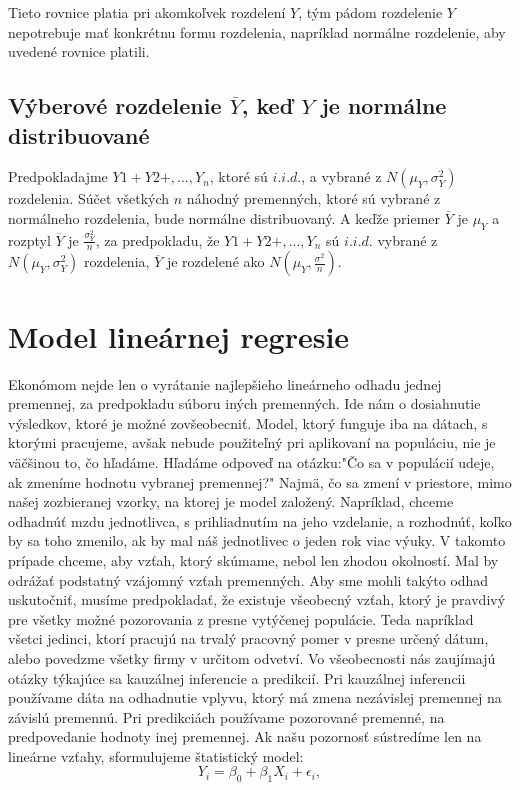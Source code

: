 \documentclass[]{tukediphc}
\begin{document}
Tieto rovnice platia pri akomkoľvek rozdelení $Y$, tým pádom rozdelenie $Y$ nepotrebuje mať konkrétnu formu rozdelenia, napríklad normálne rozdelenie, aby uvedené rovnice platili.  

\subsection{Výberové rozdelenie $\overline{Y}$, keď $Y$ je normálne distribuované}

Predpokladajme $Y1 + Y2 +, ..., Y_n$, ktoré sú $i.i.d.$, a vybrané z $N(\mu_{Y}, \sigma^2_{Y})$ rozdelenia. Súčet všetkých $n$ náhodný premenných, ktoré sú vybrané z normálneho rozdelenia, bude normálne distribuovaný. A keďže priemer $\overline{Y}$ je $\mu_{Y}$ a rozptyl $\overline{Y}$ je $\frac{\sigma^2_Y}{n}$, za predpokladu, že $Y1 + Y2 +, ..., Y_n$ sú $i.i.d.$ vybrané z $N(\mu_{Y}, \sigma^2_{Y})$ rozdelenia, $\overline{Y}$ je rozdelené ako $N(\mu_{Y}, \frac{\sigma^2}{n})$.  
\newpage
\section{Model lineárnej regresie}

Ekonómom nejde len o vyrátanie najlepšieho lineárneho odhadu jednej premennej, za predpokladu súboru iných premenných. Ide nám o dosiahnutie výsledkov, ktoré je možné zovšeobecniť. Model, ktorý funguje iba na dátach, s ktorými pracujeme, avšak nebude použiteľný pri aplikovaní na populáciu, nie je väčšinou to, čo hľadáme. Hľadáme odpoveď na otázku:"Čo sa v populácií udeje, ak zmeníme hodnotu vybranej premennej?" Najmä, čo sa zmení v priestore, mimo našej zozbieranej vzorky, na ktorej je model založený. Napríklad, chceme odhadnúť mzdu jednotlivca, s prihliadnutím na jeho vzdelanie, a rozhodnúť, koľko by sa toho zmenilo, ak by mal náš jednotlivec o jeden rok viac výuky. V takomto prípade chceme, aby vzťah, ktorý skúmame, nebol len zhodou okolností. Mal by odrážať podstatný vzájomný vzťah premenných.  Aby sme mohli takýto odhad uskutočniť, musíme predpokladať, že existuje všeobecný vzťah, ktorý je pravdivý pre všetky možné pozorovania z presne vytýčenej populácie. Teda napríklad všetci jedinci, ktorí pracujú na trvalý pracovný pomer v presne určený dátum, alebo povedzme všetky firmy v určitom odvetví. Vo všeobecnosti nás zaujímajú otázky týkajúce sa kauzálnej inferencie a predikcií. Pri kauzálnej inferencii používame dáta na odhadnutie vplyvu, ktorý má zmena nezávislej premennej na závislú premennú. Pri predikciách používame pozorované premenné, na predpovedanie hodnoty inej premennej. Ak našu pozornosť sústredíme len na lineárne vzťahy, sformulujeme štatistický model: 
\begin{equation}
    Y_i = \beta_0 + \beta_{1} X_{i} + \epsilon_i,
\end{equation}
\end{document}
